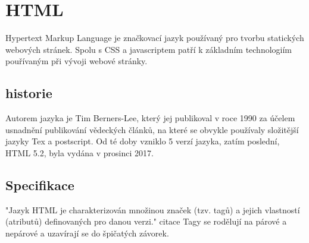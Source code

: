 \documentclass[main.tex]{subfiles}
\begin{document}
\section{HTML}
Hypertext Markup Language je značkovací jazyk používaný pro tvorbu statických webových stránek. Spolu s CSS a javascriptem patří k základním technologiím pouřívaným při vývoji webové stránky. 
\subsection{historie}
Autorem jazyka je Tim Berners-Lee, který jej publikoval v roce 1990 za účelem usnadnění publikování vědeckých článků, na které se obvykle používaly složitější jazyky Tex a postscript. Od té doby vzniklo 5 verzí jazyka, zatím poslední, HTML 5.2, byla vydána v prosinci 2017.

\subsection{Specifikace}
"Jazyk HTML je charakterizován množinou značek (tzv. tagů) a jejich vlastností (atributů) definovaných pro danou verzi." citace Tagy se rodělují na párové a nepárové a uzavírají se do špičatých závorek.
\end{document}
